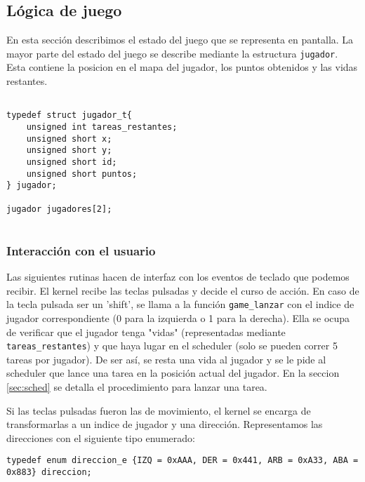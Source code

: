 \vspace{10pt}
\subsection{Lógica de juego}

\label{sec:game}

En esta sección describimos el estado del juego que se representa en pantalla.
La mayor parte del estado del juego se describe mediante la estructura \verb|jugador|. Esta contiene la posicion en el mapa del jugador, los puntos obtenidos y las vidas restantes.



\begin{verbatim}

typedef struct jugador_t{
    unsigned int tareas_restantes;
    unsigned short x;
    unsigned short y;
    unsigned short id;
    unsigned short puntos;
} jugador;

jugador jugadores[2];


\end{verbatim}


\subsubsection{Interacción con el usuario}


Las siguientes rutinas hacen de interfaz con los eventos de teclado que podemos recibir. El kernel recibe las teclas pulsadas y decide el curso de acción. 
En caso de la tecla pulsada ser un 'shift', se llama a la función \verb|game_lanzar| con el indice de jugador correspondiente (0 para la izquierda o 1 para la derecha). Ella se ocupa de verificar que el jugador tenga "vidas" (representadas mediante \verb|tareas_restantes|) y que haya lugar en el scheduler (solo se pueden correr 5 tareas por jugador). De ser así, se resta una vida al jugador y se le pide al scheduler que lance una tarea en la posición actual del jugador. En la seccion \ref{sec:sched} se detalla el procedimiento para lanzar una tarea. 

Si las teclas pulsadas fueron las de movimiento, el kernel se encarga de transformarlas a un indice de jugador y una dirección. Representamos las direcciones con el siguiente tipo enumerado:

\begin{verbatim}
typedef enum direccion_e {IZQ = 0xAAA, DER = 0x441, ARB = 0xA33, ABA = 0x883} direccion;
\end{verbatim}

